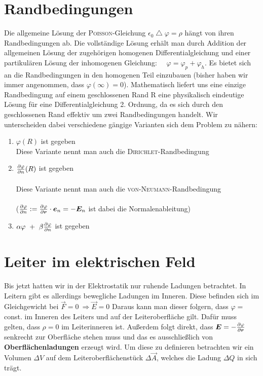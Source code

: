 \section{Randbedingungen}

Die allgemeine Lösung der \textsc{Poisson}-Gleichung $\epsilon_0 \bigtriangleup \varphi = \rho$ hängt von ihren Randbedingungen ab. Die vollständige Lösung erhält man durch Addition der allgemeinen Lösung der zugehörigen homogenen Differentialgleichung und einer partikulären Lösung der inhomogenen Gleichung: $\quad \varphi = \varphi_p + \varphi_h$. Es bietet sich an die Randbedingungen in den homogenen Teil einzubauen (bisher haben wir immer angenommen, dass $\varphi (\infty) = 0$). Mathematisch liefert uns eine einzige Randbedingung auf einem geschlossenen Rand R eine physikalisch eindeutige Lösung für eine Differentialgleichung 2. Ordnung, da es sich durch den geschlossenen Rand effektiv um zwei Randbedingungen handelt. Wir unterscheiden dabei verschiedene gängige Varianten sich dem Problem zu nähern:


\begin{enumerate}
\item $\varphi(R)$ ist gegeben\
\\
Diese Variante nennt man auch die \textsc{Dirichlet}-Randbedingung\

\item $\frac{\partial{\varphi}}{\partial{n}}(R)$ ist gegeben\
\\
\ \\
Diese Variante nennt man auch die \textsc{von-Neumann}-Randbedingung\
\\
\ \\
($\frac{\partial{\varphi}}{\partial{n}} := \frac{\partial{\varphi}}{\partial{\bm{r}}}\cdot\bm{e}_n = - \bm{E}_n$ ist dabei die Normalenableitung)\

\item $\alpha \varphi \ + \ \beta\pdiff{\varphi}{n}$ ist gegeben
\end{enumerate}

\section{Leiter im elektrischen Feld}

Bis jetzt hatten wir in der Elektrostatik nur ruhende Ladungen betrachtet. In Leitern  gibt es allerdings bewegliche Ladungen im Inneren. Diese befinden sich im Gleichgewicht bei $\vec{F}=0 \ \Rightarrow \vec{E}= 0$
Daraus kann man dieser folgern, dass $\varphi =$ const. im Inneren des Leiters und auf der Leiteroberfläche gilt. Dafür muss gelten, dass $\rho = 0$ im Leiterinneren ist. Außerdem folgt direkt, dass $\bm{E} = -\frac{\partial{\varphi}}{\partial{\bm{r}}}$ senkrecht zur Oberfläche stehen muss und das es ausschließlich von \textbf{Oberflächenladungen} erzeugt wird. Um diese zu definieren betrachten wir ein Volumen $\Delta V$ auf dem Leiteroberflächenstück $\Delta \vec{A}$, welches die Ladung $\Delta Q$ in sich trägt.

